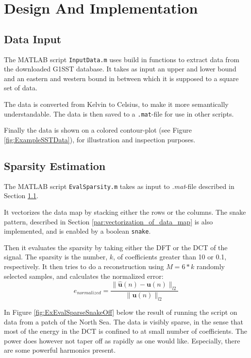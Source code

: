 \documentclass[Main]{subfiles}
\begin{document}
\section{Design And Implementation} %
\label{sec:design_and_implementation}

	\subsection{Data Input} %
	\label{sub:data_input}

		The MATLAB script \texttt{InputData.m} uses build in functions to extract data from the downloaded G1SST database.
		It takes as input an upper and lower bound and an eastern and western bound in between which it is supposed to a square set of data.

		The data is converted from Kelvin to Celsius, to make it more semantically understandable.
		The data is then saved to a \texttt{.mat}-file for use in other scripts.

		Finally the data is shown on a colored contour-plot (see Figure \ref{fig:ExampleSSTData}), for illustration and inspection purposes.

	

	\subsection{Sparsity Estimation} %
	\label{sub:sparsity_estimation}

		The MATLAB script \texttt{EvalSparsity.m} takes as input to \emph{.mat}-file described in Section \ref{sub:data_input}.

		It vectorizes the data map by stacking either the rows or the columns.
		The snake pattern, described in Section \ref{par:vectorization_of_data_map} is also implemented, and is enabled by a boolean \texttt{snake}.

		Then it evaluates the sparsity by taking either the DFT or the DCT of the signal.
		The sparsity is the number, $k$, of coefficients greater than 10 or 0.1, respectively.
		It then tries to do a reconstruction using $M = 6*k$ randomly selected samples, and calculates the normalized error:
		\begin{equation}
			e_{normalized} = \frac
				{\|\mathbf{\hat{u}}(n) - \mathbf{u}(n)\|_{l2}}
				{\|\mathbf{u}(n)\|_{l2}}
		\end{equation}

		In Figure \ref{fig:ExEvalSparseSnakeOff} below the result of running the script on data from a patch of the North Sea.
		The data is visibly sparse, in the sense that most of the energy in the DCT is confined to at small number of coefficients.
		The power does however not taper off as rapidly as one would like.
		Especially, there are some powerful harmonics present.
\end{document}
